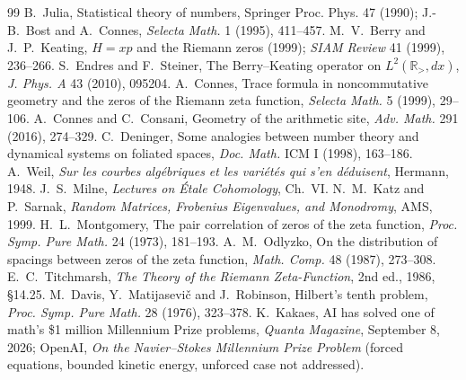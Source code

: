 \documentclass[11pt]{article}
\theoremstyle{definition}
\theoremstyle{remark}
\begin{document}
\begin{thebibliography}{99}
 B.~Julia, Statistical theory of numbers, Springer Proc. Phys. 47 (1990); J.-B.~Bost and A.~Connes, \emph{Selecta Math.} 1 (1995), 411--457.
 M.~V.~Berry and J.~P.~Keating, $H=xp$ and the Riemann zeros (1999); \emph{SIAM Review} 41 (1999), 236--266.
 S.~Endres and F.~Steiner, The Berry--Keating operator on $L^2(\mathbb R_>,dx)$, \emph{J. Phys. A} 43 (2010), 095204.
 A.~Connes, Trace formula in noncommutative geometry and the zeros of the Riemann zeta function, \emph{Selecta Math.} 5 (1999), 29--106.
 A.~Connes and C.~Consani, Geometry of the arithmetic site, \emph{Adv. Math.} 291 (2016), 274--329.
 C.~Deninger, Some analogies between number theory and dynamical systems on foliated spaces, \emph{Doc. Math.} ICM I (1998), 163--186.
 A.~Weil, \emph{Sur les courbes alg\'ebriques et les vari\'et\'es qui s'en d\'eduisent}, Hermann, 1948.
 J.~S.~Milne, \emph{Lectures on \'Etale Cohomology}, Ch.\ VI.
 N.~M.~Katz and P.~Sarnak, \emph{Random Matrices, Frobenius Eigenvalues, and Monodromy}, AMS, 1999.
 H.~L.~Montgomery, The pair correlation of zeros of the zeta function, \emph{Proc. Symp. Pure Math.} 24 (1973), 181--193.
 A.~M.~Odlyzko, On the distribution of spacings between zeros of the zeta function, \emph{Math. Comp.} 48 (1987), 273--308.
 E.~C.~Titchmarsh, \emph{The Theory of the Riemann Zeta-Function}, 2nd ed., 1986, \S14.25.
 M.~Davis, Y.~Matijasevi\v c and J.~Robinson, Hilbert's tenth problem, \emph{Proc. Symp. Pure Math.} 28 (1976), 323--378.
 K.~Kakaes, AI has solved one of math's \$1 million Millennium Prize problems, \emph{Quanta Magazine}, September 8, 2026; OpenAI, \emph{On the Navier--Stokes Millennium Prize Problem} (forced equations, bounded kinetic energy, unforced case not addressed).
\end{thebibliography}
\end{document}
